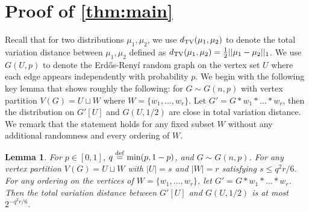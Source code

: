 \documentclass[reqno]{amsart}
\newtheorem{lemma}[theorem]{Lemma}
\theoremstyle{definition}
\numberwithin{theorem}{section}
\renewcommand{\leq}{\le}
\def\eqdef{\overset{\rm{def}}{=}}
\renewcommand{\le}{\leqslant}
\newcommand{\abs}[1]{\left|#1\right|}
\newcommand{\dtv}{d_{\textup{TV}}}
\begin{document}
\section{Proof of \cref{thm:main}}\label{sec:proof}



Recall that for two distributions $\mu_1, \mu_2$, we use $\dtv(\mu_1,\mu_2)$ to denote the total variation distance between $\mu_1,\mu_2$ defined as $\dtv(\mu_1,\mu_2) = \frac{1}{2}||\mu_1 - \mu_2||_1$. We use $G(U,p)$ to denote the Erd\H{o}s-Reny\'i random graph on the vertex set $U$ where each edge appears independently with probability $p$. We begin with the following key lemma that shows roughly the following: for $G\sim G(n,p)$ with vertex partition $V(G) = U\sqcup W$ where $W = \{w_1,\dots, w_r\}$. Let $G' = G * w_1 *\dots * w_r$, then the distribution on $G'[U]$ and $G(U,1/2)$ are close in total variation distance. We remark that the statement holds for any fixed subset $W$ without any additional randomness and every ordering of $W$.


\begin{lemma}\label{lem:close-to-uniform}
    For $p\in [0,1]$, $q\eqdef\min(p,1-p)$, and $G\sim G(n,p)$. For any vertex partition $V(G)=U\sqcup W$ with $\abs{U}=s$ and $\abs{W}=r$ satisfying $s\leq q^2r/6$. For any ordering on the vertices of $W=\{w_1,\dots,w_r\}$, let $G'=G* w_1*\dots* w_r$. Then the total variation distance between $G'[U]$ and $G(U,1/2)$ is at most $2^{-q^2r/6}$.
\end{lemma}
\end{document}
